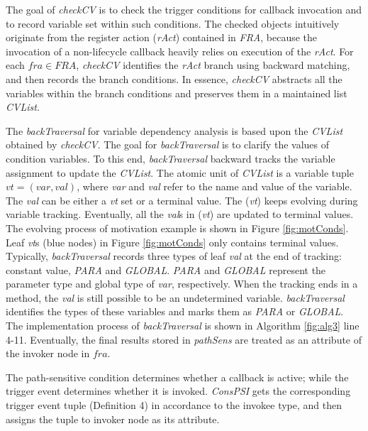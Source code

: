 The goal of \textit{checkCV} is to check the trigger conditions for callback invocation and to record variable set within such conditions. The checked objects intuitively originate from the register action (\textit{rAct}) contained in \textit{FRA}, because the invocation of a non-lifecycle callback heavily relies on execution of the \textit{rAct}. For each $fra\in FRA$, \textit{checkCV} identifies the \textit{rAct} branch using backward matching, and then records the branch conditions. In essence, \textit{checkCV} abstracts all the variables within the branch conditions and preserves them in a maintained list \textit{CVList}.

The \textit{backTraversal} for variable dependency analysis is based upon the \textit{CVList} obtained by \textit{checkCV}. The goal for \textit{backTraversal} is to clarify the values of condition variables. To this end, \textit{backTraversal} backward tracks the variable assignment to update the \textit{CVList}. The atomic unit of \textit{CVList} is a variable tuple $\textit{vt} = (var, val)$, where \textit{var} and \textit{val} refer to the name and value of the variable. The \textit{val} can be either a \textit{vt} set or a terminal value. The (\textit{vt}) keeps evolving during variable tracking. Eventually, all the \textit{val}s in (\textit{vt}) are updated to terminal values. The evolving process of motivation example is shown in Figure \ref{fig:motConds}. Leaf \textit{vt}s (blue nodes) in Figure \ref{fig:motConds} only contains terminal values. Typically, \textit{backTraversal} records three types of leaf \textit{val} at the end of tracking: constant value, \textit{PARA} and \textit{GLOBAL}. \textit{PARA} and \textit{GLOBAL} represent the parameter type and global type of \textit{var}, respectively. When the tracking ends in a method, the \textit{val} is still possible to be an undetermined variable. \textit{backTraversal} identifies the types of these variables and marks them as \textit{PARA} or \textit{GLOBAL}. The implementation process of \textit{backTraversal} is shown in Algorithm \ref{fig:alg3} line 4-11. Eventually, the final results stored in \textit{pathSens} are treated as an attribute of the invoker node in $fra$.



The path-sensitive condition determines whether a callback is active; while the trigger event determines whether it is invoked.
\textit{ConsPSI} gets the corresponding trigger event tuple (Definition 4) in accordance to the invokee type, and then assigns the tuple to invoker node as its attribute. 


